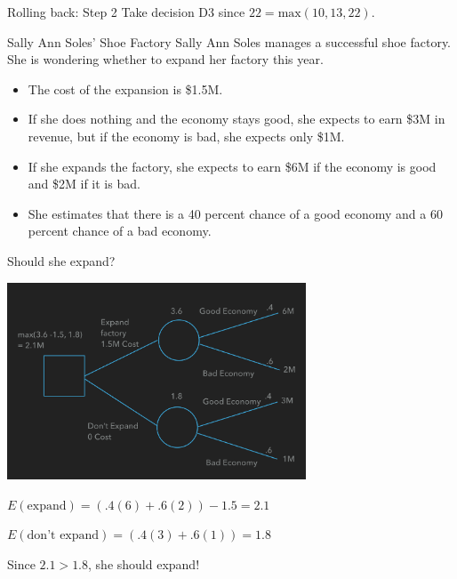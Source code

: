 \documentclass{beamer}\usepackage[]{graphicx}\usepackage[]{color}
\begin{document}
\begin{darkframes}
\begin{frame}[fragile]{Rolling back: Step 2}
      Take decision D3 since $22 = \text{max}(10, 13, 22)$.
    \end{frame}


    \begin{frame}[fragile]{Sally Ann Soles' Shoe Factory}
      Sally Ann Soles manages a successful shoe factory. She is wondering
      whether to expand her factory this year. 
      \begin{itemize}
        \item The cost of the expansion is \$1.5M.

        \item If she does nothing and the economy stays good, she expects to earn \$3M in
        revenue, but if the economy is bad, she expects only \$1M.

        \item If she expands the factory, she expects to earn \$6M if the economy is
        good and \$2M if it is bad.

        \item She estimates that there is a 40 percent chance of a good economy and
        a 60 percent chance of a bad economy.
      \end{itemize}
     Should she expand?
    \end{frame}


    \begin{frame}
      \begin{center}
        \includegraphics[width=3.5in]{ExpandFactory} \\
      \end{center}
    
    $E(\text{expand}) = (.4(6) + .6(2)) - 1.5 = 2.1$

    $E(\text{don't expand}) = (.4(3) + .6(1)) = 1.8$

    Since $2.1 > 1.8$, she should expand!
    \end{frame}



\end{darkframes}
\end{document}
